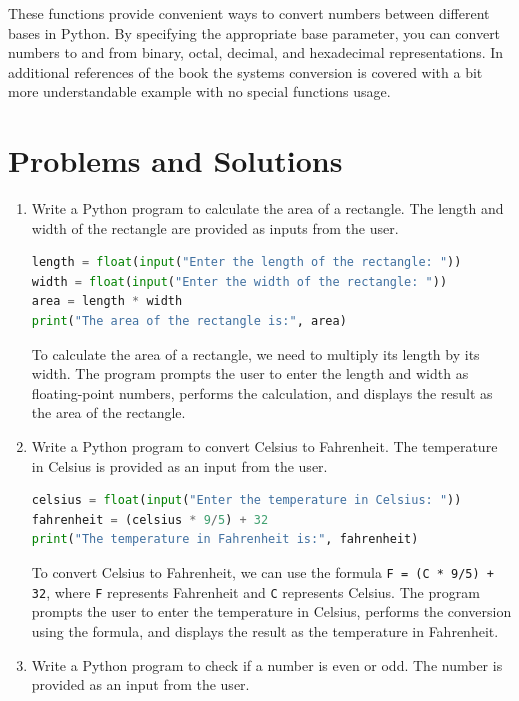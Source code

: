\documentclass[12pt]{book}
\begin{document}
These functions provide convenient ways to convert numbers between different bases in Python. By specifying the appropriate base parameter, you can convert numbers to and from binary, octal, decimal, and hexadecimal representations. In additional references of the book the systems conversion is covered with a bit more understandable example with no special functions usage.


\section{Problems and Solutions}

\begin{enumerate}
\item Write a Python program to calculate the area of a rectangle. The length and width of the rectangle are provided as inputs from the user.

\begin{lstlisting}[language=Python]
length = float(input("Enter the length of the rectangle: "))
width = float(input("Enter the width of the rectangle: "))
area = length * width
print("The area of the rectangle is:", area)
\end{lstlisting}

To calculate the area of a rectangle, we need to multiply its length by its width. The program prompts the user to enter the length and width as floating-point numbers, performs the calculation, and displays the result as the area of the rectangle.

\item Write a Python program to convert Celsius to Fahrenheit. The temperature in Celsius is provided as an input from the user.

\begin{lstlisting}[language=Python]
celsius = float(input("Enter the temperature in Celsius: "))
fahrenheit = (celsius * 9/5) + 32
print("The temperature in Fahrenheit is:", fahrenheit)
\end{lstlisting}

To convert Celsius to Fahrenheit, we can use the formula \texttt{F = (C * 9/5) + 32}, where \texttt{F} represents Fahrenheit and \texttt{C} represents Celsius. The program prompts the user to enter the temperature in Celsius, performs the conversion using the formula, and displays the result as the temperature in Fahrenheit.

 \item Write a Python program to check if a number is even or odd. The number is provided as an input from the user.


\end{enumerate}
\end{document}
